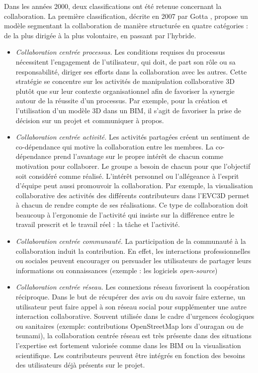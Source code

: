 Dans les années 2000, deux classifications ont été retenue concernant la 
collaboration.
La première classification, décrite en 2007 par Gotta \cite{Gotta2007}, propose 
un modèle segmentant la collaboration de manière structurée en quatre catégories 
: de la plus dirigée à la plus volontaire, en passant par l'hybride.
\begin{itemize}
	\item \textit{Collaboration centrée processus.} Les conditions requises du 
	processus 
	nécessitent l'engagement de l'utilisateur, qui doit, de part son rôle ou sa 
	responsabilité, diriger ses efforts dans la collaboration avec les autres. Cette 
	stratégie se concentre sur les activités de manipulation collaborative 3D plutôt 
	que sur leur contexte organisationnel afin de favoriser la synergie autour de la 
	réussite d'un processus. Par exemple, pour la création et l'utilisation d'un 
	modèle 	3D dans un \gls{BIM}, il s'agit de favoriser la prise de décision sur un 
	projet et 	communiquer à propos.
	
	\item \textit{Collaboration centrée activité.}
	Les activités partagées créent un sentiment de co-dé\-pendance qui motive la 
	collaboration entre les membres. La co-dépendance prend l'avantage sur le 
	propre intérêt de chacun comme motivation pour collaborer. Le groupe a besoin 
	de chacun pour que l'objectif soit considéré comme réalisé. L'intérêt personnel 
	ou l'allégeance à l'esprit d'équipe peut aussi promouvoir la collaboration. Par 
	exemple, la visualisation collaborative des activités des différents contributeurs 
	dans l'\gls{EVC3D} permet à chacun de rendre compte de ses réalisations. Ce 
	type de collaboration doit beaucoup à l'ergonomie de l'activité qui insiste sur la 
	différence entre le travail prescrit et le travail réel : la tâche et l'activité.
	
	\item \textit{Collaboration centrée communauté.}
	La participation de la communauté à la collaboration induit la contribution. En 
	effet, les interactions professionnelles ou sociales peuvent encourager ou 
	persuader les utilisateurs de partager leurs informations ou connaissances 
	(exemple : les logiciels \textit{open-source})
	
	\item \textit{Collaboration centrée réseau.}
	Les connexions réseau favorisent la coopération réciproque. Dans le but de 
	récupérer des avis ou du savoir faire externe, un utilisateur peut faire appel à 
	son réseau social pour supplémenter une autre interaction collaborative. 
	Souvent utilisée dans le cadre d'urgences écologiques ou sanitaires (exemple: 
	contributions OpenStreetMap lors d'ouragan ou de tsunami), la collaboration 
	centrée réseau est très présente dans des situations l'expertise est fortement 
	valorisée comme dans les \gls{BIM} ou la visualisation scientifique. Les 
	contributeurs peuvent être intégrés en fonction des besoins des utilisateurs déjà 
	présents sur le projet.
\end{itemize}
